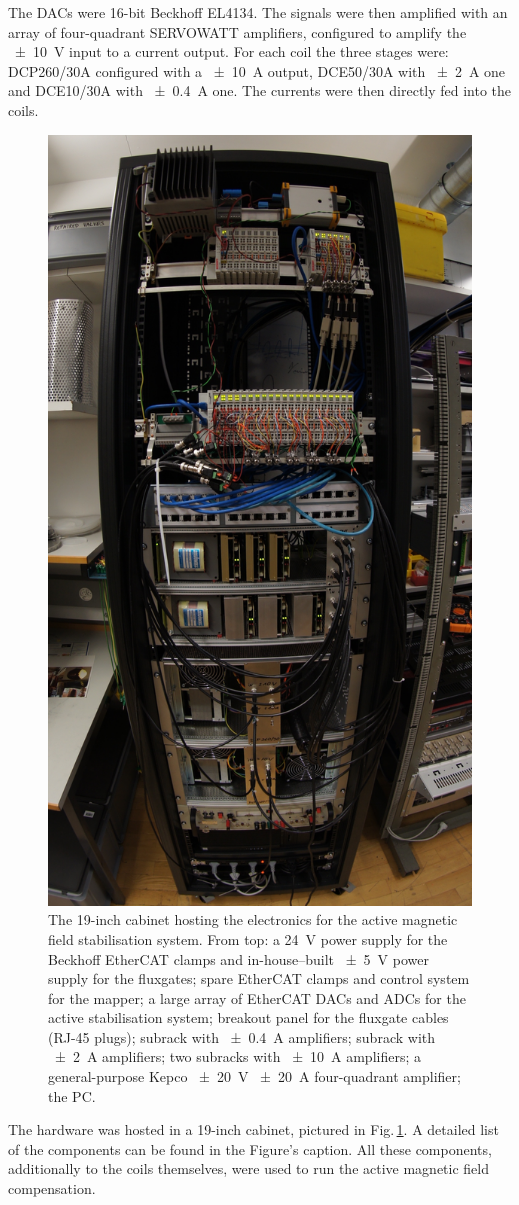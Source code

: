The DACs were 16-bit Beckhoff EL4134. The signals were then amplified with an array of four-quadrant SERVOWATT amplifiers, configured to amplify the \SI{\pm 10}{\volt} input to a current output. For each coil the three stages were: DCP260/30A configured with a \SI{\pm 10}{\ampere} output, DCE50/30A with \SI{\pm 2}{\ampere} one and DCE10/30A with \SI{\pm 0.4}{\ampere} one. The currents were then directly fed into the coils.

\begin{figure}
  \centering
  \includegraphics[width=0.4\linewidth]{gfx/prototype/DSC03477_cropped.jpeg}
  \caption{The 19-inch cabinet hosting the electronics for the active magnetic field stabilisation system. From top: a \SI{24}{V} power supply for the Beckhoff EtherCAT clamps and in-house--built \SI{\pm 5}{\volt} power supply for the fluxgates; spare EtherCAT clamps and control system for the mapper; a large array of EtherCAT DACs and ADCs for the active stabilisation system; breakout panel for the fluxgate cables (RJ-45 plugs); subrack with \SI{\pm 0.4}{A} amplifiers; subrack with \SI{\pm 2}{A} amplifiers; two subracks with \SI{\pm 10}{A} amplifiers; a general-purpose Kepco \SI{\pm 20}{V} \SI{\pm 20}{A} four-quadrant amplifier; the PC.}
  \label{fig:prototype_photo_daq}
\end{figure}

The hardware was hosted in a 19-inch cabinet, pictured in Fig.\,\ref{fig:prototype_photo_daq}. A detailed list of the components can be found in the Figure's caption. All these components, additionally to the coils themselves, were used to run the active magnetic field compensation.


